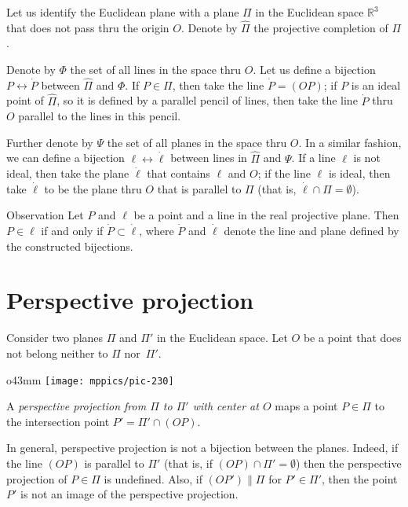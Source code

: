 Let us identify the Euclidean plane with a plane $\Pi$ in the Euclidean space $\mathbb{R}^3$ that does not pass thru the origin $O$.
Denote by $\hat\Pi$ the projective completion of $\Pi$.

Denote by $\Phi$ the set of all lines in the space thru $O$.
Let us define a bijection $P\leftrightarrow \dot P$ between $\hat \Pi$ and $\Phi$.
If $P\in \Pi$, then take the line $\dot P=(OP)$;
if $P$ is an ideal point of $\hat \Pi$, so it is defined by a parallel pencil of lines, then take the line $\dot P$ thru $O$ parallel to the lines in this pencil.

Further denote by $\Psi$ the set of all planes in the space thru $O$.
In a similar fashion, we can define a bijection $\ell\leftrightarrow \dot \ell$ between lines in $\hat \Pi$ and $\Psi$.
If a line $\ell$ is not ideal, then take the plane  $\dot \ell$ that contains $\ell$ and $O$;
if the line $\ell$ is ideal, then take $\dot \ell$ to be the plane thru $O$ that is parallel to $\Pi$ (that is, $\dot\ell\cap\Pi=\emptyset$).

\begin{thm}{Observation}\label{obs:bijections}
Let $P$ and $\ell$ be a point and a line in the real projective plane.
Then $P\in \ell$ if and only if $\dot P\subset \dot \ell$,
where $\dot P$ and $\dot \ell$ denote the line and plane defined by the constructed bijections.
\end{thm}

\section*{Perspective projection}

Consider two planes $\Pi$ and $\Pi'$ 
in the Euclidean space. 
Let $O$ be a point that does not belong neither to $\Pi$ nor~$\Pi'$.

\begin{wrapfigure}{o}{43mm}
\centering
\texttt{[image: mppics/pic-230]}
\end{wrapfigure}

A \emph{perspective projection from $\Pi$ to $\Pi'$ with center at $O$} maps a point $P\in \Pi$
to the intersection point $P'=\Pi'\cap (OP)$.

In general, perspective projection is not a bijection between the planes.
Indeed, if the line $(OP)$ is parallel to $\Pi'$ 
(that is, if $(OP)\cap\Pi'=\emptyset$)
then the perspective projection of $P\in \Pi$ is undefined.
Also, if $(OP')\parallel \Pi$ 
for $P'\in \Pi'$,
then the point $P'$ is not an image of the perspective projection.

